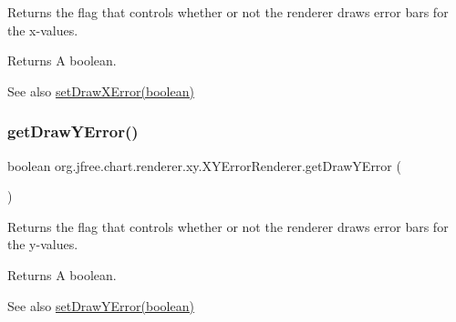 Returns the flag that controls whether or not the renderer draws error bars for the x-\/values.

\begin{DoxyReturn}{Returns}
A boolean.
\end{DoxyReturn}
\begin{DoxySeeAlso}{See also}
\mbox{\hyperlink{classorg_1_1jfree_1_1chart_1_1renderer_1_1xy_1_1_x_y_error_renderer_a77815f8cffa301cab035dfb21d5d3481}{set\+Draw\+X\+Error(boolean)}} 
\end{DoxySeeAlso}
\mbox{\label{classorg_1_1jfree_1_1chart_1_1renderer_1_1xy_1_1_x_y_error_renderer_a5c8f1a7133334d269616167fa9600e99}} 
\subsubsection{\texorpdfstring{get\+Draw\+Y\+Error()}{getDrawYError()}}
{\footnotesize\ttfamily boolean org.\+jfree.\+chart.\+renderer.\+xy.\+X\+Y\+Error\+Renderer.\+get\+Draw\+Y\+Error (\begin{DoxyParamCaption}{ }\end{DoxyParamCaption})}

Returns the flag that controls whether or not the renderer draws error bars for the y-\/values.

\begin{DoxyReturn}{Returns}
A boolean.
\end{DoxyReturn}
\begin{DoxySeeAlso}{See also}
\mbox{\hyperlink{classorg_1_1jfree_1_1chart_1_1renderer_1_1xy_1_1_x_y_error_renderer_a46148e12e76dcd87d154d10127632570}{set\+Draw\+Y\+Error(boolean)}} 
\end{DoxySeeAlso}
\mbox{\label{classorg_1_1jfree_1_1chart_1_1renderer_1_1xy_1_1_x_y_error_renderer_aa366f33967304e07b792820fef8b3333}} 
